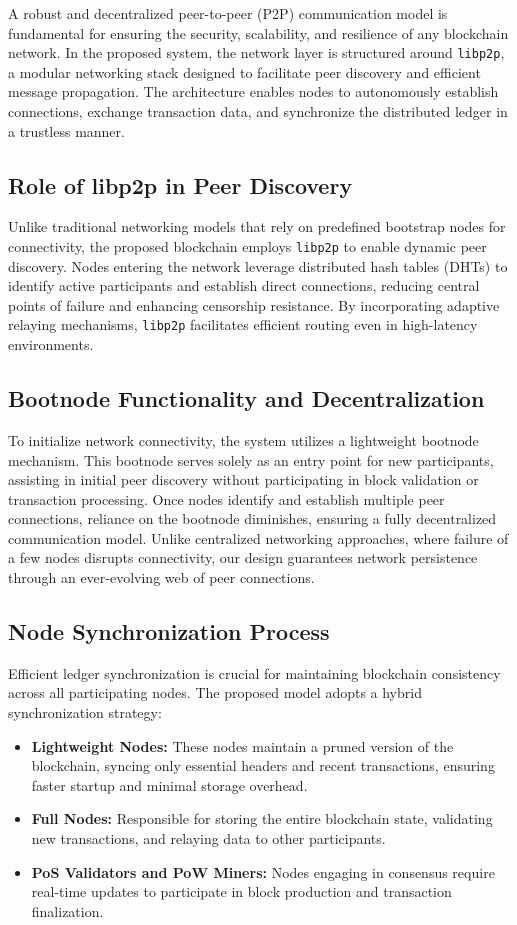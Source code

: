 \documentclass[conference]{IEEEtran}
\begin{document}
A robust and decentralized peer-to-peer (P2P) communication model is fundamental for ensuring the security, scalability, and resilience of any blockchain network. In the proposed system, the network layer is structured around \texttt{libp2p}, a modular networking stack designed to facilitate peer discovery and efficient message propagation. The architecture enables nodes to autonomously establish connections, exchange transaction data, and synchronize the distributed ledger in a trustless manner.

\subsection{Role of libp2p in Peer Discovery}
Unlike traditional networking models that rely on predefined bootstrap nodes for connectivity, the proposed blockchain employs \texttt{libp2p} to enable dynamic peer discovery. Nodes entering the network leverage distributed hash tables (DHTs) to identify active participants and establish direct connections, reducing central points of failure and enhancing censorship resistance. By incorporating adaptive relaying mechanisms, \texttt{libp2p} facilitates efficient routing even in high-latency environments.

\subsection{Bootnode Functionality and Decentralization}
To initialize network connectivity, the system utilizes a lightweight bootnode mechanism. This bootnode serves solely as an entry point for new participants, assisting in initial peer discovery without participating in block validation or transaction processing. Once nodes identify and establish multiple peer connections, reliance on the bootnode diminishes, ensuring a fully decentralized communication model. Unlike centralized networking approaches, where failure of a few nodes disrupts connectivity, our design guarantees network persistence through an ever-evolving web of peer connections.

\subsection{Node Synchronization Process}
Efficient ledger synchronization is crucial for maintaining blockchain consistency across all participating nodes. The proposed model adopts a hybrid synchronization strategy:
\begin{itemize}
    \item \textbf{Lightweight Nodes:} These nodes maintain a pruned version of the blockchain, syncing only essential headers and recent transactions, ensuring faster startup and minimal storage overhead.
    \item \textbf{Full Nodes:} Responsible for storing the entire blockchain state, validating new transactions, and relaying data to other participants.
    \item \textbf{PoS Validators and PoW Miners:} Nodes engaging in consensus require real-time updates to participate in block production and transaction finalization.
\end{itemize}
\end{document}
